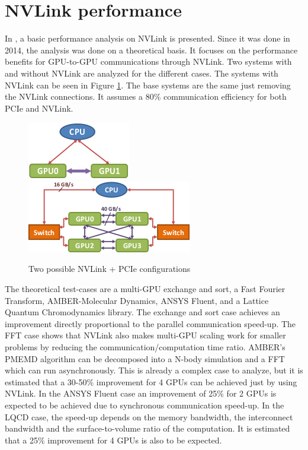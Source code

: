 \section{NVLink performance}
In \cite{nvidia:nvlinkperformance}, a basic performance analysis on NVLink is presented.
Since it was done in 2014, the analysis was done on a theoretical basis.
It focuses on the performance benefits for GPU-to-GPU communications through NVLink.
Two systems with and without NVLink are analyzed for the different cases.
The systems with NVLink can be seen in Figure \ref{fig:nvlinkconfigs}.
The base systems are the same just removing the NVLink connections.
It assumes a 80\% communication efficiency for both PCIe and NVLink.

\begin{figure}[ht!]
    \centering
    \includegraphics[width=0.45\linewidth]{2gpus}\\
    \vspace*{0.5cm}
    \includegraphics[width=0.8\linewidth]{4gpus}
    \caption{Two possible NVLink + PCIe configurations}
    \label{fig:nvlinkconfigs}
\end{figure}

The theoretical test-cases are a multi-GPU exchange and sort, a Fast Fourier Transform, AMBER-Molecular Dynamics, ANSYS Fluent, and a Lattice Quantum Chromodynamics library.
The exchange and sort case achieves an improvement directly proportional to the parallel communication speed-up.
The FFT case shows that NVLink also makes multi-GPU scaling work for smaller problems by reducing the communication/computation time ratio.
AMBER's PMEMD algorithm can be decomposed into a N-body simulation and a FFT which can run asynchronously.
This is already a complex case to analyze, but it is estimated that a 30-50\% improvement for 4 GPUs can be achieved just by using NVLink.
In the ANSYS Fluent case an improvement of 25\% for 2 GPUs is expected to be achieved due to synchronous communication speed-up.
In the LQCD case, the speed-up depends on the memory bandwidth, the interconnect bandwidth and the surface-to-volume ratio of the computation.
It is estimated that a 25\% improvement for 4 GPUs is also to be expected.

